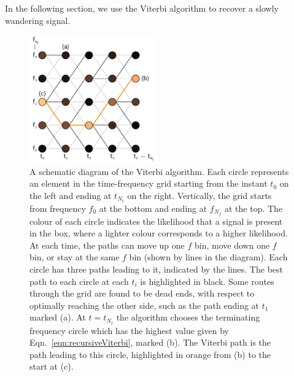 \documentclass[paper-main.tex]{subfiles}
\begin{document}
In the following section, we use the Viterbi algorithm to recover a slowly wandering signal.



\begin{figure}
\includegraphics[width=0.49\textwidth]{figures/viterbiDiagram.pdf}
\caption{\label{fig:viterbi}
A schematic diagram of the Viterbi algorithm. 
Each circle represents an element in the time-frequency grid starting from the instant $t_0$ on the left and ending at $t_{N_t}$ on the right. 
Vertically, the grid starts from frequency $f_0$ at the bottom and ending at $f_{N_f}$ at the top. 
The colour of each circle indicates the likelihood that a signal is present in the box, where a lighter colour corresponds to a higher likelihood. 
At each time, the paths can move up one $f$ bin, move down one $f$ bin, or stay at the same $f$ bin (shown by lines in the diagram). 
Each circle has three paths leading to it, indicated by the lines. 
The best path to each circle at each $t_i$ is highlighted in black. 
Some routes through the grid are found to be dead ends, with respect to optimally reaching the other side, such as the path ending at $t_1$ marked (a). 
At $t=t_{N_t}$ the algorithm chooses the terminating frequency circle which has the highest value given by Eqn.~\ref{eqn:recursiveViterbi}, marked (b). 
The Viterbi path is the path leading to this circle, highlighted in orange from (b) to the start at (c). 
}
\end{figure}
\end{document}
